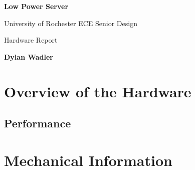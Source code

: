 \documentclass[letterpaper, 11pt, twoside]{article}
\begin{document}
\begin{titlepage}
	\begin{center}

	\vspace*{1cm}
	\Huge
	\textbf{Low Power Server}

	\vspace{0.5cm}
	\LARGE
	University of Rochester ECE Senior Design 

	\vspace{1cm}
	\LARGE
	Hardware Report
	\vspace{1.5cm}
	
	\textbf{Dylan Wadler} 
	\vfill
	
	
	\end{center}
\end{titlepage}
\cleardoublepage


\tableofcontents
\setcounter{page}{1}

\cleardoublepage

\section[Overview]{Overview of the Hardware}

\paragraph{}

\subsection{Performance}
\paragraph{}

\subsection{}

\cleardoublepage

\section{Mechanical Information}
\end{document}
